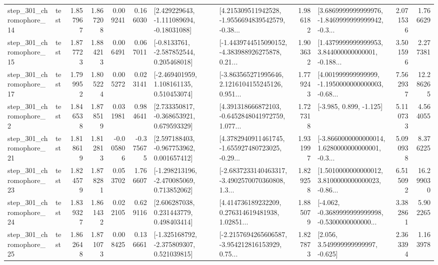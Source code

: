 \begin{tabular}{llrrrrllrlrr}
  step\_301\_chromophore\_14 &      test &      1.857967 &    1.867208 &      0.009241 &  0.166030 &    [2.429229643, -1.111089694, -0.18031088] &  [4.215309511942528, -1.9556694839542579, -0.38... &       1.986182 &  [3.6869999999999976, -1.8469999999999942, -0.3... &            2.071536 &          1.766629 \\
  step\_301\_chromophore\_15 &      test &      1.877723 &    1.884213 &      0.006491 &  0.067011 &     [-0.8133761, -2.587852544, 0.205468018] &  [-1.4439744515090152, -4.383988926275878, 0.21... &       1.903632 &  [1.4379999999999953, 3.844000000000001, -0.188... &            3.501596 &          2.277381 \\
  step\_301\_chromophore\_17 &      test &      1.799952 &    1.805224 &      0.005272 &  0.023141 &    [-2.469401959, 1.108161135, 0.510453074] &  [-3.863565271995646, 2.1216104155245126, 0.951... &       1.779243 &  [4.001999999999999, -1.1950000000000003, -0.68... &            7.562937 &         12.286265 \\
   step\_301\_chromophore\_2 &      test &      1.846538 &    1.878519 &      0.031981 &  0.984641 &    [2.733350817, -0.368653921, 0.679593329] &  [4.391318666872103, -0.6452848041972759, 1.077... &       1.727318 &                            [-3.985, 0.899, -1.125] &            5.110733 &          4.564055 \\
  step\_301\_chromophore\_21 &      test &      1.818619 &    1.812813 &     -0.005806 & -0.375675 &    [2.597188403, -0.967753962, 0.001657412] &  [4.3782940911461745, -1.655927480723025, -0.29... &       1.931997 &  [-3.8660000000000014, 1.6280000000000001, -0.3... &            5.090938 &          8.376225 \\
  step\_301\_chromophore\_23 &      test &      1.824579 &    1.878281 &      0.053702 &  1.766607 &   [-1.298213196, -2.470085069, 0.713852062] &  [-2.6837233140463317, -3.4902570070360808, 1.3... &       1.829258 &  [1.5010000000000012, 3.8100000000000023, -0.86... &            6.515092 &         16.299030 \\
  step\_301\_chromophore\_24 &      test &      1.839327 &    1.861432 &      0.022105 &  0.629116 &     [2.606287038, 0.231443779, 0.498403414] &  [4.414736189232209, 0.276314619481938, 1.02851... &       1.885079 &  [-4.062, -0.3689999999999998, -0.5300000000000... &            3.382861 &          5.902265 \\
  step\_301\_chromophore\_25 &      test &      1.862648 &    1.871073 &      0.008425 &  0.136661 &   [-1.325168792, -2.375809307, 0.521039815] &  [-2.2157694265606587, -3.954212816153929, 0.75... &       1.827873 &                 [2.056, 3.549999999999997, -0.625] &            2.363394 &          1.163978 \\

\end{tabular}

